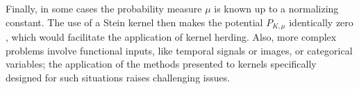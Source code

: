 Finally, in some cases the probability measure $\mu$ is known up to a normalizing constant. 
The use of a Stein kernel then makes the potential $P_{K,\mu}$ identically zero \cite{ChenMGBO2018,ChenBBGGMO2019}, which would facilitate the application of kernel herding. 
Also, more complex problems involve functional inputs, like temporal signals or images, or categorical variables; the application of the methods presented to kernels specifically designed for such situations raises challenging issues. 






